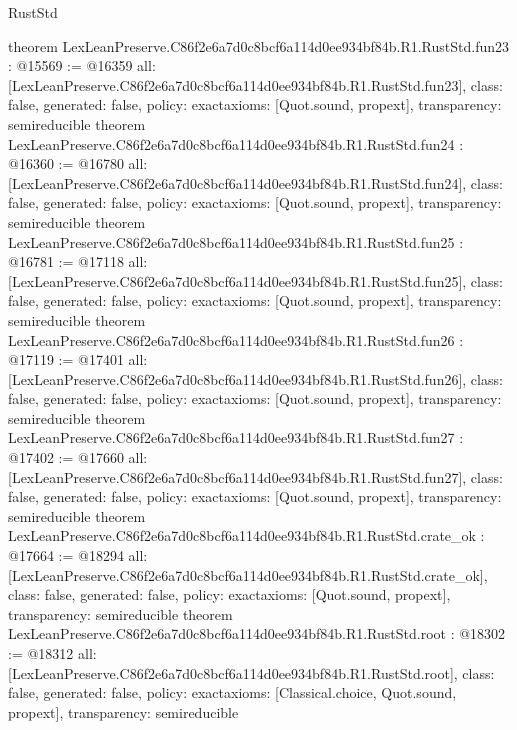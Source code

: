 \begin{lexlean}{RustStd}
\begin{coremodule}
{}
theorem LexLeanPreserve.C86f2e6a7d0c8bcf6a114d0ee934bf84b.R1.RustStd.fun23 : @15569 := @16359 {
  all: [LexLeanPreserve.C86f2e6a7d0c8bcf6a114d0ee934bf84b.R1.RustStd.fun23],
  class: false,
  generated: false,
  policy: exact{axioms: [Quot.sound, propext]},
  transparency: semireducible
}
theorem LexLeanPreserve.C86f2e6a7d0c8bcf6a114d0ee934bf84b.R1.RustStd.fun24 : @16360 := @16780 {
  all: [LexLeanPreserve.C86f2e6a7d0c8bcf6a114d0ee934bf84b.R1.RustStd.fun24],
  class: false,
  generated: false,
  policy: exact{axioms: [Quot.sound, propext]},
  transparency: semireducible
}
theorem LexLeanPreserve.C86f2e6a7d0c8bcf6a114d0ee934bf84b.R1.RustStd.fun25 : @16781 := @17118 {
  all: [LexLeanPreserve.C86f2e6a7d0c8bcf6a114d0ee934bf84b.R1.RustStd.fun25],
  class: false,
  generated: false,
  policy: exact{axioms: [Quot.sound, propext]},
  transparency: semireducible
}
theorem LexLeanPreserve.C86f2e6a7d0c8bcf6a114d0ee934bf84b.R1.RustStd.fun26 : @17119 := @17401 {
  all: [LexLeanPreserve.C86f2e6a7d0c8bcf6a114d0ee934bf84b.R1.RustStd.fun26],
  class: false,
  generated: false,
  policy: exact{axioms: [Quot.sound, propext]},
  transparency: semireducible
}
theorem LexLeanPreserve.C86f2e6a7d0c8bcf6a114d0ee934bf84b.R1.RustStd.fun27 : @17402 := @17660 {
  all: [LexLeanPreserve.C86f2e6a7d0c8bcf6a114d0ee934bf84b.R1.RustStd.fun27],
  class: false,
  generated: false,
  policy: exact{axioms: [Quot.sound, propext]},
  transparency: semireducible
}
theorem LexLeanPreserve.C86f2e6a7d0c8bcf6a114d0ee934bf84b.R1.RustStd.crate_ok : @17664 := @18294 {
  all: [LexLeanPreserve.C86f2e6a7d0c8bcf6a114d0ee934bf84b.R1.RustStd.crate_ok],
  class: false,
  generated: false,
  policy: exact{axioms: [Quot.sound, propext]},
  transparency: semireducible
}
theorem LexLeanPreserve.C86f2e6a7d0c8bcf6a114d0ee934bf84b.R1.RustStd.root : @18302 := @18312 {
  all: [LexLeanPreserve.C86f2e6a7d0c8bcf6a114d0ee934bf84b.R1.RustStd.root],
  class: false,
  generated: false,
  policy: exact{axioms: [Classical.choice, Quot.sound, propext]},
  transparency: semireducible
}


\end{coremodule}
\end{lexlean}
